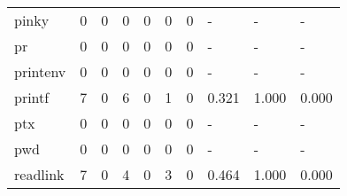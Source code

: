 \begin{longtable}{lp{2.0cm}p{2.0cm}p{2.0cm}p{2.0cm}p{2.0cm}p{2.0cm}p{2.0cm}p{2.0cm}p{2.0cm}}
pinky     &                      0 &                                  0 &                                 0 &                                0 &                                 0 &                               0 &                                    - &                                      - &                                    - \\
pr        &                      0 &                                  0 &                                 0 &                                0 &                                 0 &                               0 &                                    - &                                      - &                                    - \\
printenv  &                      0 &                                  0 &                                 0 &                                0 &                                 0 &                               0 &                                    - &                                      - &                                    - \\
printf    &                      7 &                                  0 &                                 6 &                                0 &                                 1 &                               0 &                                0.321 &                                  1.000 &                                0.000 \\
ptx       &                      0 &                                  0 &                                 0 &                                0 &                                 0 &                               0 &                                    - &                                      - &                                    - \\
pwd       &                      0 &                                  0 &                                 0 &                                0 &                                 0 &                               0 &                                    - &                                      - &                                    - \\
readlink  &                      7 &                                  0 &                                 4 &                                0 &                                 3 &                               0 &                                0.464 &                                  1.000 &                                0.000 \\

\end{longtable}
